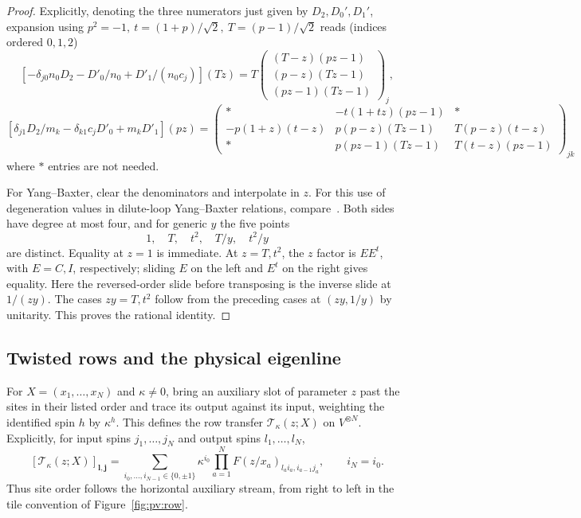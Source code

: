 \begin{proof}
Explicitly, denoting the three numerators just given by \(D_2,D_0',D_1'\), expansion using \(p^2=-1,\ t=(1+p)/\sqrt2,\ T=(p-1)/\sqrt2\) reads (indices ordered \(0,1,2\))
\[
 \left[-\delta_{j0}n_0 D_2-D'_0/n_0+D'_1/(n_0 c_j)\right](Tz)
 =T\begin{pmatrix}(T-z)(p z-1)\\(p-z)(Tz-1)\\(p z-1)(Tz-1)\end{pmatrix}_j ,
\]
{\small
\[
 \left[\delta_{j1}D_2/m_k-\delta_{k1}c_j D'_0+m_k D'_1\right](pz)
 =
 \begin{pmatrix}
 * & -t(1+tz)(p z-1)&*\\
 -p(1+z)(t-z)&p(p-z)(Tz-1)&T(p-z)(t-z)\\
 * &p(p z-1)(Tz-1)&T(t-z)(p z-1)
 \end{pmatrix}_{j k}
\]
}
where \(*\) entries are not needed.

For Yang--Baxter, clear the denominators and interpolate in \(z\).
For this use of degeneration values in dilute-loop Yang--Baxter
relations, compare~\cite[Section~4]{MorinDuchesnePearce2019}.
Both sides have degree at most four, and for generic \(y\) the five
points
\[
 1,\quad T,\quad t^2,\quad T/y,\quad t^2/y
\]
are distinct. Equality at \(z=1\) is immediate. At \(z=T,t^2\), the
\(z\) factor is \(EE^t\), with \(E=C,I\), respectively; sliding \(E\)
on the left and \(E^t\) on the right gives equality. Here the
reversed-order slide before transposing is the inverse slide at
\(1/(zy)\). The cases \(zy=T,t^2\) follow from the preceding cases
at \((zy,1/y)\) by unitarity. This proves the rational identity.
\end{proof}

\subsection*{Twisted rows and the physical eigenline}

For \(X=(x_1,\ldots,x_N)\) and \(\kappa\ne0\), bring an auxiliary
slot of parameter \(z\) past the sites in their listed order and trace
its output against its input, weighting the identified spin \(h\) by
\(\kappa^h\). This defines the row transfer
\(\mathcal T_\kappa(z;X)\) on \(V^{\otimes N}\). Explicitly, for
input spins \(j_1,\ldots,j_N\) and output spins \(l_1,\ldots,l_N\),
\[
 [\mathcal T_\kappa(z;X)]_{\boldsymbol l,\boldsymbol j}
 =\sum_{i_0,\ldots,i_{N-1}\in\{0,\pm1\}}
 \kappa^{i_0}\prod_{a=1}^N
 F(z/x_a)_{l_a i_a,i_{a-1}j_a},\qquad i_N=i_0.
\]
Thus site order follows the horizontal auxiliary stream, from right to
left in the tile convention of Figure~\ref{fig:pv:row}.

